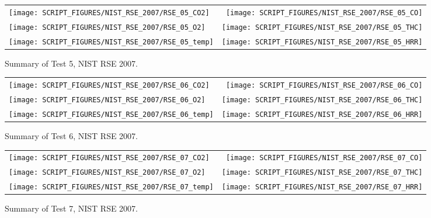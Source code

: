 \begin{figure}[p]
\begin{tabular*}{\textwidth}{l@{\extracolsep{\fill}}r}
\texttt{[image: SCRIPT\_FIGURES/NIST\_RSE\_2007/RSE\_05\_CO2]} &
\texttt{[image: SCRIPT\_FIGURES/NIST\_RSE\_2007/RSE\_05\_CO]} \\
\texttt{[image: SCRIPT\_FIGURES/NIST\_RSE\_2007/RSE\_05\_O2]} &
\texttt{[image: SCRIPT\_FIGURES/NIST\_RSE\_2007/RSE\_05\_THC]} \\
\texttt{[image: SCRIPT\_FIGURES/NIST\_RSE\_2007/RSE\_05\_temp]} &
\texttt{[image: SCRIPT\_FIGURES/NIST\_RSE\_2007/RSE\_05\_HRR]}
\end{tabular*}
\caption[Summary of Test 5, NIST RSE 2007]{Summary of Test 5, NIST RSE 2007.}
\label{NIST_RSE_2007_5}
\end{figure}

\begin{figure}[p]
\begin{tabular*}{\textwidth}{l@{\extracolsep{\fill}}r}
\texttt{[image: SCRIPT\_FIGURES/NIST\_RSE\_2007/RSE\_06\_CO2]} &
\texttt{[image: SCRIPT\_FIGURES/NIST\_RSE\_2007/RSE\_06\_CO]} \\
\texttt{[image: SCRIPT\_FIGURES/NIST\_RSE\_2007/RSE\_06\_O2]} &
\texttt{[image: SCRIPT\_FIGURES/NIST\_RSE\_2007/RSE\_06\_THC]} \\
\texttt{[image: SCRIPT\_FIGURES/NIST\_RSE\_2007/RSE\_06\_temp]} &
\texttt{[image: SCRIPT\_FIGURES/NIST\_RSE\_2007/RSE\_06\_HRR]}
\end{tabular*}
\caption[Summary of Test 6, NIST RSE 2007]{Summary of Test 6, NIST RSE 2007.}
\label{NIST_RSE_2007_6}
\end{figure}

\begin{figure}[p]
\begin{tabular*}{\textwidth}{l@{\extracolsep{\fill}}r}
\texttt{[image: SCRIPT\_FIGURES/NIST\_RSE\_2007/RSE\_07\_CO2]} &
\texttt{[image: SCRIPT\_FIGURES/NIST\_RSE\_2007/RSE\_07\_CO]} \\
\texttt{[image: SCRIPT\_FIGURES/NIST\_RSE\_2007/RSE\_07\_O2]} &
\texttt{[image: SCRIPT\_FIGURES/NIST\_RSE\_2007/RSE\_07\_THC]} \\
\texttt{[image: SCRIPT\_FIGURES/NIST\_RSE\_2007/RSE\_07\_temp]} &
\texttt{[image: SCRIPT\_FIGURES/NIST\_RSE\_2007/RSE\_07\_HRR]}
\end{tabular*}
\caption[Summary of Test 7, NIST RSE 2007]{Summary of Test 7, NIST RSE 2007.}
\label{NIST_RSE_2007_7}
\end{figure}

